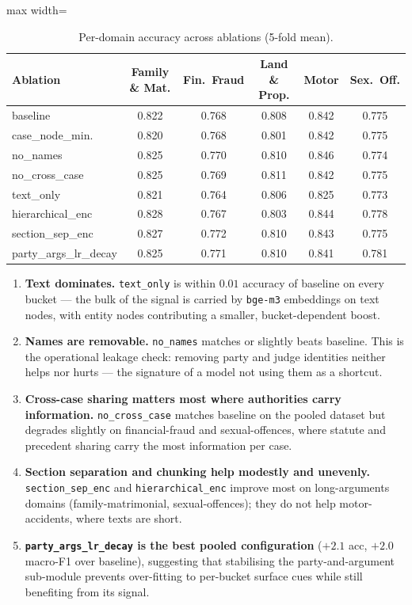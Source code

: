 \begin{table}[H]
  \centering
  \scriptsize
  \begin{adjustbox}{max width=\textwidth}
  \begin{tabular}{lccccc}
    \toprule
    Ablation & Family \& Mat. & Fin.\ Fraud & Land \& Prop. & Motor & Sex.\ Off. \\
    \midrule
    baseline          & 0.822 & 0.768 & 0.808 & 0.842 & 0.775 \\
    case\_node\_min.  & 0.820 & 0.768 & 0.801 & 0.842 & 0.775 \\
    no\_names         & 0.825 & 0.770 & 0.810 & 0.846 & 0.774 \\
    no\_cross\_case   & 0.825 & 0.769 & 0.811 & 0.842 & 0.775 \\
    text\_only        & 0.821 & 0.764 & 0.806 & 0.825 & 0.773 \\
    hierarchical\_enc & 0.828 & 0.767 & 0.803 & 0.844 & 0.778 \\
    section\_sep\_enc & 0.827 & 0.772 & 0.810 & 0.843 & 0.775 \\
    party\_args\_lr\_decay & 0.825 & 0.771 & 0.810 & 0.841 & 0.781 \\
    \bottomrule
  \end{tabular}
  \end{adjustbox}
  \caption{Per-domain accuracy across ablations (5-fold mean).}
  \label{tab:ablation_per_domain}
\end{table}

\begin{enumerate}
  \item \textbf{Text dominates.} \texttt{text\_only} is within $0.01$ accuracy of baseline on every bucket --- the bulk of the signal is carried by \texttt{bge-m3} embeddings on text nodes, with entity nodes contributing a smaller, bucket-dependent boost.
  \item \textbf{Names are removable.} \texttt{no\_names} matches or slightly beats baseline. This is the operational leakage check: removing party and judge identities neither helps nor hurts --- the signature of a model not using them as a shortcut.
  \item \textbf{Cross-case sharing matters most where authorities carry information.} \texttt{no\_cross\_case} matches baseline on the pooled dataset but degrades slightly on financial-fraud and sexual-offences, where statute and precedent sharing carry the most information per case.
  \item \textbf{Section separation and chunking help modestly and unevenly.} \texttt{section\_sep\_enc} and \texttt{hierarchical\_enc} improve most on long-arguments domains (family-matrimonial, sexual-offences); they do not help motor-accidents, where texts are short.
  \item \textbf{\texttt{party\_args\_lr\_decay} is the best pooled configuration} ($+2.1$ acc, $+2.0$ macro-F1 over baseline), suggesting that stabilising the party-and-argument sub-module prevents over-fitting to per-bucket surface cues while still benefiting from its signal.
\end{enumerate}

